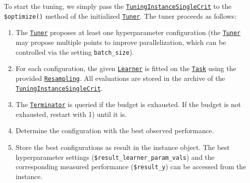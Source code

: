 \documentclass[
]{scrbook}
\newenvironment{Shaded}{\begin{snugshade}}{\end{snugshade}}
\newcommand{\FunctionTok}[1]{\textcolor[rgb]{0.00,0.00,0.00}{#1}}
\newcommand{\NormalTok}[1]{#1}
\newcommand{\SpecialCharTok}[1]{\textcolor[rgb]{0.00,0.00,0.00}{#1}}
\providecommand{\tightlist}{%
  \setlength{\itemsep}{0pt}\setlength{\parskip}{0pt}}
\renewenvironment{Shaded} {\begin{snugshade}\small} {\end{snugshade}}
\begin{document}
To start the tuning, we simply pass the \href{https://mlr3tuning.mlr-org.com/reference/TuningInstanceSingleCrit.html}{\texttt{TuningInstanceSingleCrit}} to the \texttt{\$optimize()} method of the initialized \href{https://mlr3tuning.mlr-org.com/reference/Tuner.html}{\texttt{Tuner}}.
The tuner proceeds as follows:

\begin{enumerate}
\def\labelenumi{\arabic{enumi}.}
\tightlist
\item
  The \href{https://mlr3tuning.mlr-org.com/reference/Tuner.html}{\texttt{Tuner}} proposes at least one hyperparameter configuration (the \href{https://mlr3tuning.mlr-org.com/reference/Tuner.html}{\texttt{Tuner}} may propose multiple points to improve parallelization, which can be controlled via the setting \texttt{batch\_size}).
\item
  For each configuration, the given \href{https://mlr3.mlr-org.com/reference/Learner.html}{\texttt{Learner}} is fitted on the \href{https://mlr3.mlr-org.com/reference/Task.html}{\texttt{Task}} using the provided \href{https://mlr3.mlr-org.com/reference/Resampling.html}{\texttt{Resampling}}.
  All evaluations are stored in the archive of the \href{https://mlr3tuning.mlr-org.com/reference/TuningInstanceSingleCrit.html}{\texttt{TuningInstanceSingleCrit}}.
\item
  The \href{https://bbotk.mlr-org.com/reference/Terminator.html}{\texttt{Terminator}} is queried if the budget is exhausted.
  If the budget is not exhausted, restart with 1) until it is.
\item
  Determine the configuration with the best observed performance.
\item
  Store the best configurations as result in the instance object.
  The best hyperparameter settings (\texttt{\$result\_learner\_param\_vals}) and the corresponding measured performance (\texttt{\$result\_y}) can be accessed from the instance.
\end{enumerate}

\begin{Shaded}
\end{Shaded}
\end{document}
